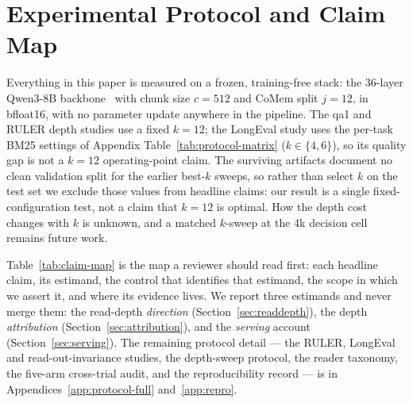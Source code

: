 \section{Experimental Protocol and Claim Map}
\label{sec:protocol}

Everything in this paper is measured on a frozen, training-free stack: the
36-layer Qwen3-8B backbone~\citep{qwen3} with chunk size $c=512$ and CoMem split
$j=12$, in bfloat16, with no parameter update anywhere in the pipeline.  The qa1
and RULER depth studies use a fixed $k=12$; the LongEval study uses the per-task
BM25 settings of Appendix Table~\ref{tab:protocol-matrix} ($k\in\{4,6\}$), so its
quality gap is not a $k{=}12$ operating-point claim.  The surviving artifacts
document no clean validation split for the earlier best-$k$ sweeps, so rather than
select $k$ on the test set we exclude those values from headline claims: our
result is a single fixed-configuration test, not a claim that $k=12$ is optimal.
How the depth cost changes with $k$ is unknown, and a matched $k$-sweep at the 4k
decision cell remains future work.

Table~\ref{tab:claim-map} is the map a reviewer should read first: each headline
claim, its estimand, the control that identifies that estimand, the scope in
which we assert it, and where its evidence lives.  We report three estimands and
never merge them: the read-depth \emph{direction}
(Section~\ref{sec:readdepth}), the depth \emph{attribution}
(Section~\ref{sec:attribution}), and the \emph{serving} account
(Section~\ref{sec:serving}).  The remaining protocol detail --- the RULER,
LongEval and read-out-invariance studies, the depth-sweep protocol, the reader
taxonomy, the five-arm cross-trial audit, and the reproducibility record --- is in
Appendices~\ref{app:protocol-full} and~\ref{app:repro}.

